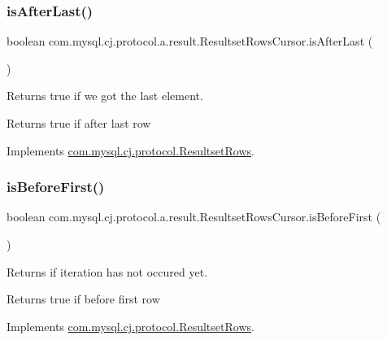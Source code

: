 \subsubsection{\texorpdfstring{is\+After\+Last()}{isAfterLast()}}
{\footnotesize\ttfamily boolean com.\+mysql.\+cj.\+protocol.\+a.\+result.\+Resultset\+Rows\+Cursor.\+is\+After\+Last (\begin{DoxyParamCaption}{ }\end{DoxyParamCaption})}

Returns true if we got the last element.

\begin{DoxyReturn}{Returns}
true if after last row 
\end{DoxyReturn}


Implements \mbox{\hyperlink{interfacecom_1_1mysql_1_1cj_1_1protocol_1_1_resultset_rows_a8599e016249b697a11560806dc290a87}{com.\+mysql.\+cj.\+protocol.\+Resultset\+Rows}}.

\mbox{\label{classcom_1_1mysql_1_1cj_1_1protocol_1_1a_1_1result_1_1_resultset_rows_cursor_a6ca4bec845f7589a9182c52c8f81e0c2}} 
\subsubsection{\texorpdfstring{is\+Before\+First()}{isBeforeFirst()}}
{\footnotesize\ttfamily boolean com.\+mysql.\+cj.\+protocol.\+a.\+result.\+Resultset\+Rows\+Cursor.\+is\+Before\+First (\begin{DoxyParamCaption}{ }\end{DoxyParamCaption})}

Returns if iteration has not occured yet.

\begin{DoxyReturn}{Returns}
true if before first row 
\end{DoxyReturn}


Implements \mbox{\hyperlink{interfacecom_1_1mysql_1_1cj_1_1protocol_1_1_resultset_rows_a748205e182d8b1b1263ebe78c7062517}{com.\+mysql.\+cj.\+protocol.\+Resultset\+Rows}}.

